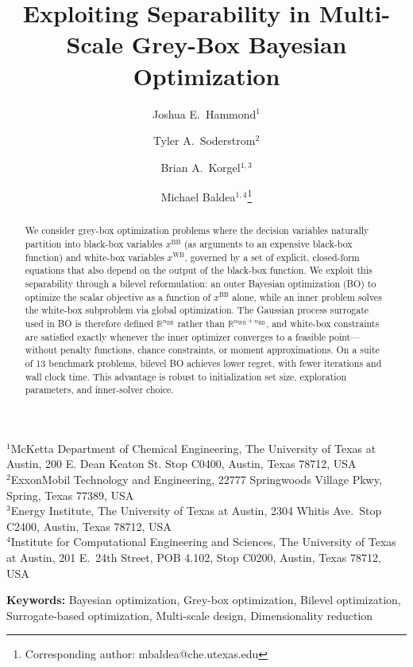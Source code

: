 \documentclass[12pt,a4paper]{article}%
\theoremstyle{plain}%
\theoremstyle{remark}%
\theoremstyle{definition}%
\def\WB{\mathrm{WB}}
\def\BB{\mathrm{BB}}
\begin{document}
\title{Exploiting Separability in Multi-Scale Grey-Box Bayesian Optimization}

\author{Joshua E.\ Hammond$^{1}$ \and Tyler A.\ Soderstrom$^{2}$ \and Brian A.\ Korgel$^{1,3}$ \and Michael Baldea$^{1,4}$\thanks{Corresponding author: mbaldea@che.utexas.edu}}

\date{}

\maketitle

\noindent$^{1}$McKetta Department of Chemical Engineering, The University of Texas at Austin, 200 E. Dean Keaton St. Stop C0400, Austin, Texas 78712, USA\\
$^{2}$ExxonMobil Technology and Engineering, 22777 Springwoods Village Pkwy, Spring, Texas 77389, USA\\
$^{3}$Energy Institute, The University of Texas at Austin, 2304 Whitis Ave.\ Stop C2400, Austin, Texas 78712, USA\\
$^{4}$Institute for Computational Engineering and Sciences, The University of Texas at Austin, 201 E.\ 24th Street, POB 4.102, Stop C0200, Austin, Texas 78712, USA

\bigskip

\begin{abstract}
We consider grey-box optimization problems where the decision variables naturally partition into black-box variables $x^{\BB}$ (as arguments to an expensive black-box function) and white-box variables $x^{\WB}$, governed by a set of explicit, closed-form equations that also depend on the output of the black-box function. We exploit this separability through a bilevel reformulation: an outer Bayesian optimization (BO) to optimize the scalar objective as a function of $x^{\BB}$ alone, while an inner problem solves the white-box subproblem via global optimization. The Gaussian process surrogate used in BO is therefore defined $\mathbb{R}^{n_{\BB}}$ rather than $\mathbb{R}^{n_{\WB}+n_{\BB}}$, and white-box constraints are satisfied exactly whenever the inner optimizer converges to a feasible point---without penalty functions, chance constraints, or moment approximations. On a suite of 13 benchmark problems, bilevel BO achieves lower regret, with fewer iterations and wall clock time. This advantage is robust to initialization set size, exploration parameters, and inner-solver choice.
\end{abstract}

\noindent\textbf{Keywords:} Bayesian optimization, Grey-box optimization, Bilevel optimization, Surrogate-based optimization, Multi-scale design, Dimensionality reduction
\end{document}
